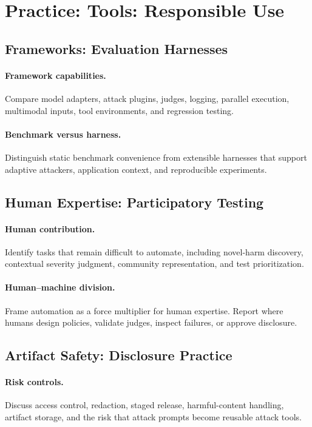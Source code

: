 \documentclass[review]{fcs}
\begin{document}
\section{Practice: Tools: Responsible Use}
\label{sec:practice}

\subsection{Frameworks: Evaluation Harnesses}

\paragraph{Framework capabilities.}
Compare model adapters, attack plugins, judges, logging, parallel execution, multimodal inputs, tool environments, and regression testing.

\paragraph{Benchmark versus harness.}
Distinguish static benchmark convenience from extensible harnesses that support adaptive attackers, application context, and reproducible experiments.

\subsection{Human Expertise: Participatory Testing}

\paragraph{Human contribution.}
Identify tasks that remain difficult to automate, including novel-harm discovery, contextual severity judgment, community representation, and test prioritization.

\paragraph{Human--machine division.}
Frame automation as a force multiplier for human expertise. Report where humans design policies, validate judges, inspect failures, or approve disclosure.

\subsection{Artifact Safety: Disclosure Practice}

\paragraph{Risk controls.}
Discuss access control, redaction, staged release, harmful-content handling, artifact storage, and the risk that attack prompts become reusable attack tools.
\end{document}
